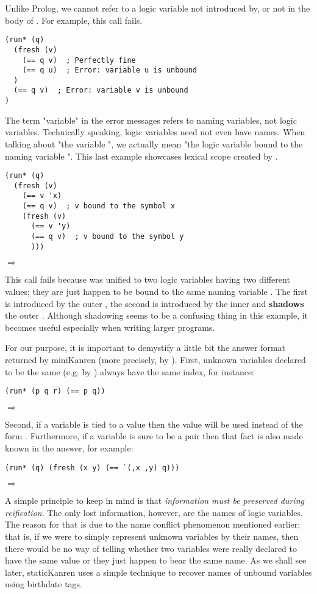 Unlike Prolog, we cannot refer to a logic variable not introduced by, or not in the body of . For example, this call fails.
\begin{lstlisting}
(run* (q)
  (fresh (v)
    (== q v)  ; Perfectly fine
    (== q u)  ; Error: variable u is unbound
  )
  (== q v)  ; Error: variable v is unbound
)
\end{lstlisting}
The term "variable" in the error messages refers to naming variables, not logic variables. Technically speaking, logic variables need not even have names. When talking about "the variable ", we actually mean "the logic variable bound to the naming variable ". This last example showcases lexical scope created by .
\begin{lstlisting}
(run* (q)
  (fresh (v)
    (== v 'x)
    (== q v)  ; v bound to the symbol x
    (fresh (v)
      (== v 'y)
      (== q v)  ; v bound to the symbol y
      )))
\end{lstlisting}
$\Rightarrow$ \code{()}

This call fails because  was unified to two logic variables having two different values; they are just happen to be bound to the same naming variable . The first  is introduced by the outer , the second  is introduced by the inner  and \textbf{shadows} the outer . Although shadowing seems to be a confusing thing in this example, it becomes useful especially when writing larger programs.

For our purpose, it is important to demystify a little bit the answer format returned by miniKanren (more precisely, by ). First, unknown variables declared to be the same (e.g. by \code{==}) always have the same index, for instance:
\begin{lstlisting}
(run* (p q r) (== p q))
\end{lstlisting}
$\Rightarrow$ 

Second, if a variable is tied to a value then the value will be used instead of the form . Furthermore, if a variable is sure to be a pair then that fact is also made known in the answer, for example:
\begin{lstlisting}
(run* (q) (fresh (x y) (== `(,x ,y) q)))
\end{lstlisting}
$\Rightarrow$ 

A simple principle to keep in mind is that \textit{information must be preserved during reification}. The only lost information, however, are the names of logic variables. The reason for that is due to the name conflict phenomenon mentioned earlier; that is, if we were to simply represent unknown variables by their names, then there would be no way of telling whether two variables were really declared to have the same value or they just happen to bear the same name. As we shall see later, staticKanren uses a simple technique to recover names of unbound variables using birthdate tags.

